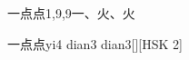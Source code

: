 \begin{entry}{一点点}{1,9,9}{⼀、⽕、⽕}
  \begin{phonetics}{一点点}{yi4 dian3 dian3}[][HSK 2]
  \end{phonetics}
\end{entry}
